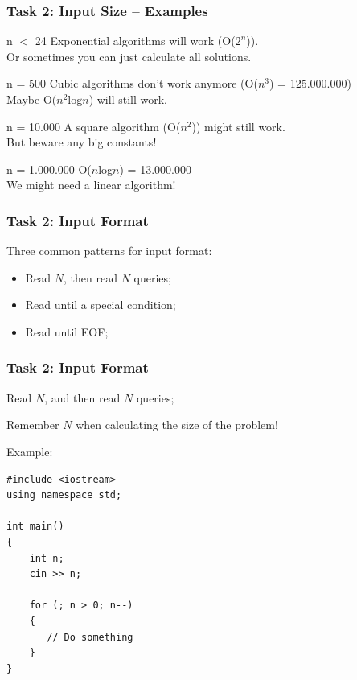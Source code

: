 \begin{frame}
  \frametitle{Task 2: Input Size -- Examples}

  \begin{block}{n $<$ 24}
    Exponential algorithms will work (O($2^n$)).\\
    Or sometimes you can just calculate all solutions.
  \end{block}

  \begin{block}{n = 500}
    Cubic algorithms don't work anymore (O($n^3$) = 125.000.000)\\
    Maybe O($n^2\text{log}n$) will still work.
  \end{block}

  \begin{block}{n = 10.000}
    A square algorithm (O($n^2$)) might still work.\\
    But beware any big constants!
  \end{block}

  \begin{block}{n = 1.000.000}
    O($n$log$n$) = 13.000.000\\
    We might need a linear algorithm!
  \end{block}
\end{frame}

\begin{frame}
  \frametitle{Task 2: Input Format}

  Three common patterns for input format:
  \vfill

  \begin{itemize}
  \item Read $N$, then read $N$ queries;
  \bigskip

  \item Read until a special condition;
  \bigskip

  \item Read until EOF;
  \end{itemize}
\end{frame}

\begin{frame}[fragile]
  \frametitle{Task 2: Input Format}
  \begin{block}{}
    Read $N$, and then read $N$ queries;
    \bigskip

    Remember $N$ when calculating the size of the problem!
  \end{block}
  Example: 

{\smaller
\begin{verbatim}
#include <iostream>
using namespace std;

int main()
{
    int n;
    cin >> n;

    for (; n > 0; n--)
    {
       // Do something
    }
}
\end{verbatim}}

\end{frame}

